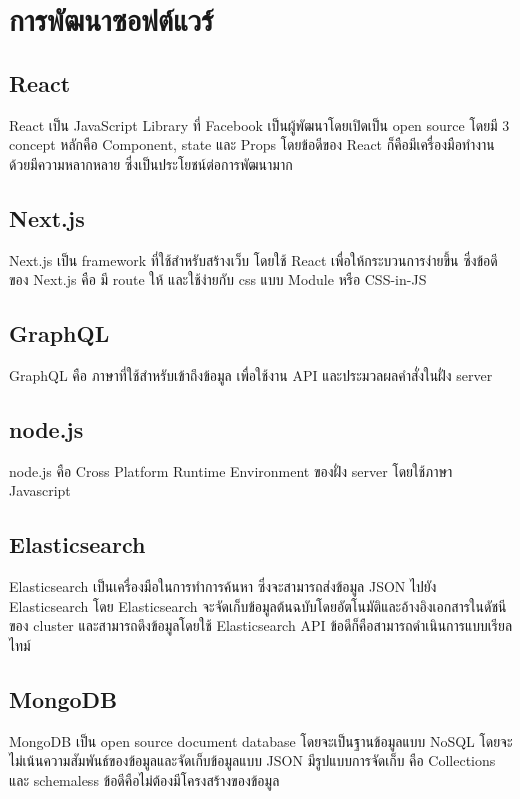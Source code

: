 \section{การพัฒนาซอฟต์แวร์}
\subsection{React}
React เป็น JavaScript Library ที่ Facebook เป็นผู้พัฒนาโดยเปิดเป็น open source โดยมี 3 concept หลักคือ Component, state และ Props โดยข้อดีของ React ก็คือมีเครื่องมือทำงานด้วยมีความหลากหลาย ซึ่งเป็นประโยชน์ต่อการพัฒนามาก \cite{react}

\subsection{Next.js}
Next.js เป็น framework ที่ใช้สำหรับสร้างเว็บ โดยใช้ React เพื่อให้กระบวนการง่ายขึ้น ซึ่งข้อดีของ Next.js คือ มี route ให้ และใช้ง่ายกับ css แบบ Module หรือ CSS-in-JS \cite{nextjs}

\subsection{GraphQL}
GraphQL คือ ภาษาที่ใช้สำหรับเข้าถึงข้อมูล เพื่อใช้งาน API และประมวลผลคำสั่งในฝั่ง server \cite{graphql}

\subsection{node.js}
node.js คือ  Cross Platform Runtime Environment ของฝั่ง server โดยใช้ภาษา Javascript \cite{nodejs}

\subsection{Elasticsearch}
Elasticsearch เป็นเครื่องมือในการทำการค้นหา ซึ่งจะสามารถส่งข้อมูล JSON ไปยัง Elasticsearch โดย Elasticsearch จะจัดเก็บข้อมูลต้นฉบับโดยอัตโนมัติและอ้างอิงเอกสารในดัชนีของ cluster และสามารถดึงข้อมูลโดยใช้ Elasticsearch API ข้อดีก็คือสามารถดำเนินการแบบเรียลไทม์\cite{elastic}

\subsection{MongoDB}
MongoDB เป็น open source document database โดยจะเป็นฐานข้อมูลแบบ NoSQL โดยจะไม่เน้นความสัมพันธ์ของข้อมูลและจัดเก็บข้อมูลแบบ JSON มีรูปแบบการจัดเก็บ คือ Collections และ schemaless ข้อดีคือไม่ต้องมีโครงสร้างของข้อมูล \cite{mongodb}

